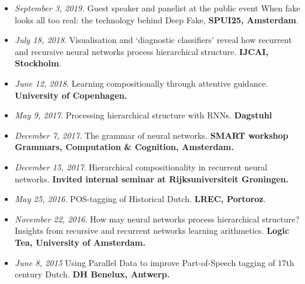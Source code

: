 \begin{itemize}
    \item \textit{September 3, 2019.} Guest speaker and panelist at the public event When fake looks all too real: the technology behind Deep Fake, \textbf{SPUI25, Amsterdam}.
    \item \textit{July 18, 2018}. Visualisation and ‘diagnostic classifiers’ reveal how recurrent and recursive neural networks process hierarchical structure. \textbf{IJCAI, Stockholm}.
    \item \textit{June 12, 2018}. Learning compositionally through attentive guidance. \textbf{University of Copenhagen.}
    \item \textit{May 9, 2017}. Processing hierarchical structure with RNNs.\textbf{ Dagstuhl}
    \item \textit{December 7, 2017}. The grammar of neural networks. \textbf{SMART workshop Grammars, Computation \& Cognition, Amsterdam.}
    \item \textit{December 15, 2017}. Hierarchical compositionality in recurrent neural networks. \textbf{Invited internal seminar at Rijksuniversiteit Groningen.}
    \item \textit{May 25, 2016}. POS-tagging of Historical Dutch. \textbf{LREC, Portoroz}.
    \item \textit{November 22, 2016}. How may neural networks process hierarchical structure? Insights from recursive and recurrent networks learning arithmetics. \textbf{Logic Tea, University of Amsterdam.}
    \item \textit{June 8, 2015} Using Parallel Data to improve Part-of-Speech tagging of 17th century Dutch. \textbf{DH Benelux, Antwerp.}
\end{itemize}
